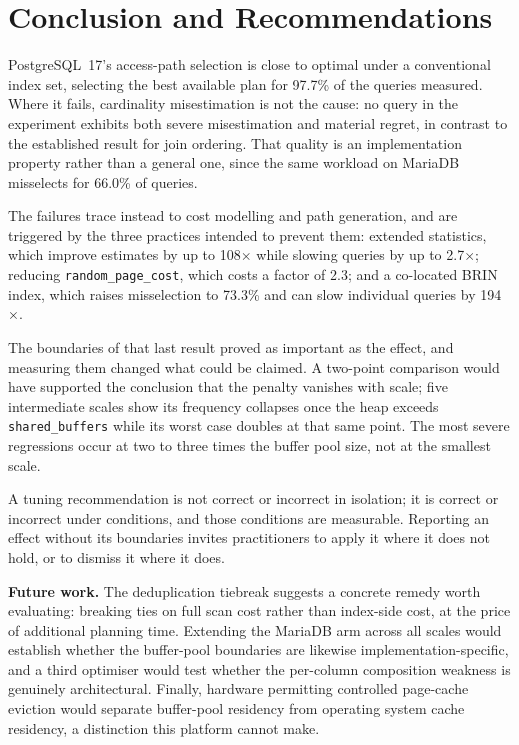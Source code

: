 \documentclass[12pt, a4paper]{article}
\newcommand{\rpc}{\texttt{random\_page\_cost}}
\newcommand{\sbuf}{\texttt{shared\_buffers}}
\begin{document}
\section{Conclusion and Recommendations}
\label{sec:conclusion}

PostgreSQL~17's access-path selection is close to optimal under a
conventional index set, selecting the best available plan for 97.7\% of
the queries measured. Where it fails, cardinality misestimation is not
the cause: no query in the experiment exhibits both severe misestimation
and material regret, in contrast to the established result for join
ordering. That quality is an implementation property rather than a
general one, since the same workload on MariaDB misselects for 66.0\% of
queries.

The failures trace instead to cost modelling and path generation, and
are triggered by the three practices intended to prevent them: extended
statistics, which improve estimates by up to 108$\times$ while slowing
queries by up to 2.7$\times$; reducing \rpc{}, which costs a factor of
2.3; and a co-located BRIN index, which raises misselection to 73.3\%
and can slow individual queries by 194$\times$.

The boundaries of that last result proved as important as the effect,
and measuring them changed what could be claimed. A two-point comparison
would have supported the conclusion that the penalty vanishes with
scale; five intermediate scales show its frequency collapses once the
heap exceeds \sbuf{} while its worst case doubles at that same point.
The most severe regressions occur at two to three times the buffer pool
size, not at the smallest scale.

A tuning recommendation is not correct or incorrect in isolation; it is
correct or incorrect under conditions, and those conditions are
measurable. Reporting an effect without its boundaries invites
practitioners to apply it where it does not hold, or to dismiss it where
it does.

\textbf{Future work.} The deduplication tiebreak suggests a concrete
remedy worth evaluating: breaking ties on full scan cost rather than
index-side cost, at the price of additional planning time. Extending the
MariaDB arm across all scales would establish whether the buffer-pool
boundaries are likewise implementation-specific, and a third optimiser
would test whether the per-column composition weakness is genuinely
architectural. Finally, hardware permitting controlled page-cache
eviction would separate buffer-pool residency from operating system
cache residency, a distinction this platform cannot make.
\end{document}
